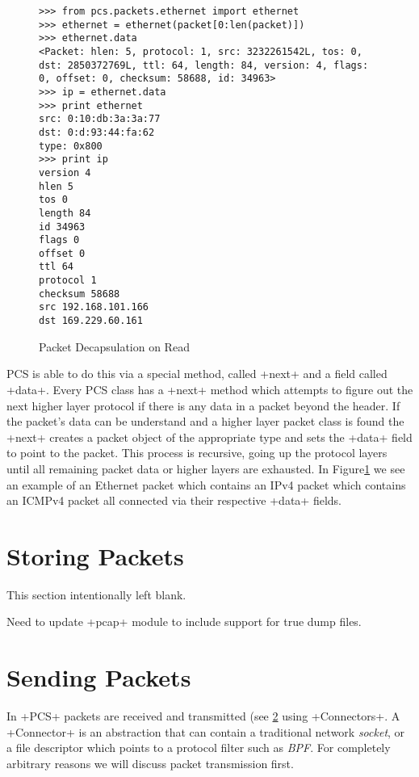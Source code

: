 \documentclass[11pt]{article}
\begin{document}
\begin{figure}
  \centering
\begin{lstlisting}
>>> from pcs.packets.ethernet import ethernet
>>> ethernet = ethernet(packet[0:len(packet)])
>>> ethernet.data
<Packet: hlen: 5, protocol: 1, src: 3232261542L, tos: 0, dst: 2850372769L, ttl: 64, length: 84, version: 4, flags: 0, offset: 0, checksum: 58688, id: 34963>
>>> ip = ethernet.data
>>> print ethernet
src: 0:10:db:3a:3a:77
dst: 0:d:93:44:fa:62
type: 0x800
>>> print ip
version 4
hlen 5
tos 0
length 84
id 34963
flags 0
offset 0
ttl 64
protocol 1
checksum 58688
src 192.168.101.166
dst 169.229.60.161
\end{lstlisting}
  \caption{Packet Decapsulation on Read}
  \label{fig:packet-decapsulation-on-read}
\end{figure}

PCS is able to do this via a special method, called \method+next+ and
a field called \field+data+.  Every PCS class has a \method+next+
method which attempts to figure out the next higher layer protocol if
there is any data in a packet beyond the header.  If the packet's data
can be understand and a higher layer packet class is found the
\method+next+ creates a packet object of the appropriate type and
sets the \field+data+ field to point to the packet.  This process is
recursive, going up the protocol layers until all remaining packet
data or higher layers are exhausted.  In
Figure\ref{fig:packet-decapsulation-on-read} we see an example of an
Ethernet packet which contains an IPv4 packet which contains an ICMPv4
packet all connected via their respective \field+data+ fields.

\section{Storing Packets}

This section intentionally left blank.

Need to update \program+pcap+ module to include support for true dump
files.

\section{Sending Packets}
\label{sec:sending-packets}

In \program+PCS+ packets are received and transmitted (see
\ref{sec:sending-packets} using \class+Connectors+.  A
\class+Connector+ is an abstraction that can contain a traditional
network \emph{socket}, or a file descriptor which points to a protocol
filter such as \emph{BPF}.  For completely arbitrary reasons we will
discuss packet transmission first.
\end{document}
